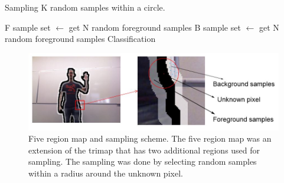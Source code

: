 \begin{algorithm}
\caption{Sampling K random samples within a circle.}\label{old-sampling-method}
\begin{algorithmic}[1]
\State F sample set $\gets$ get N random foreground samples
\State B sample set $\gets$ get N random foreground samples
\EndFor
\EndFor
\State Classification
\end{algorithmic}
\end{algorithm}

\begin{figure}[t!]
\centering
\includegraphics[width=1\columnwidth]{Chapter4/4/old_method.jpg}
\caption[Old sampling strategy.]{Five region map and sampling scheme. The five region map was an extension of the trimap that has two additional regions used for sampling. The sampling was done by selecting random samples within a radius around the unknown pixel.}
\label{fig:old-method-f}
\end{figure}

